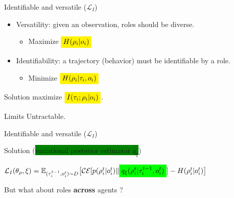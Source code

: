 \documentclass{beamer}
\newcommand{\mathcolorbox}[2]{\colorbox{#1}{$\displaystyle #2$}}
\begin{document}
    \begin{frame}{Identifiable and versatile ($\mathcal{L}_{I}$)}

        \begin{itemize}
            \item Versatility: given an observation, roles should be diverse.
            \begin{itemize}
                \item Maximize $\mathcolorbox{yellow}{H(\rho_i|o_i)}$
            \end{itemize}
            \pause\item Identifiability: a trajectory (behavior) must be identifiable by a role.
            \begin{itemize}
                \item Minimize $\mathcolorbox{yellow}{H(\rho_i|\tau_i, o_i)}$
            \end{itemize}
        \end{itemize}
        \pause
        \begin{exampleblock}{Solution}
            maximize $\mathcolorbox{yellow}{I(\tau_i;\rho_i|o_i)}$.
        \end{exampleblock}
        \pause
        \begin{alertblock}{Limits}
            Untractable.
        \end{alertblock}
    \end{frame}
    \begin{frame}{Identifiable and versatile ($\mathcal{L}_{I}$)}

        \begin{exampleblock}{Solution (\colorbox{green}{variational posterior estimator $q_\xi$})}

            $\mathcal{L}_I(\theta_\rho, \xi) = \mathbb{E}_{(\tau^{t-1}_i, o^t_i)\sim D}\big[\mathcal{CE}[p(\rho^{t}_i | o^t_i)\| \mathcolorbox{green}{q_\xi(\rho^{t}_i | \tau^{t-1}_i, o^t_i)}] - H(\rho^{t}_i | o^t_i)\big]$

        \end{exampleblock}

        \pause
        \begin{block}{}
            But what about roles \textbf{across} agents ?
        \end{block}

    \end{frame}
\end{document}
